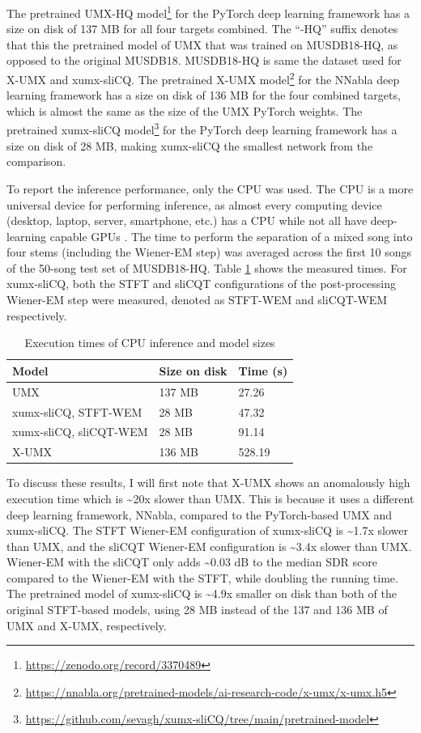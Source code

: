 \documentclass[report.tex]{subfiles}
\begin{document}
The pretrained UMX-HQ model\footnote{\url{https://zenodo.org/record/3370489}} for the PyTorch deep learning framework has a size on disk of 137 MB for all four targets combined. The ``-HQ'' suffix denotes that this the pretrained model of UMX that was trained on MUSDB18-HQ, as opposed to the original MUSDB18. MUSDB18-HQ is same the dataset used for X-UMX and xumx-sliCQ. The pretrained X-UMX model\footnote{\url{https://nnabla.org/pretrained-models/ai-research-code/x-umx/x-umx.h5}} for the NNabla deep learning framework has a size on disk of 136 MB for the four combined targets, which is almost the same as the size of the UMX PyTorch weights. The pretrained xumx-sliCQ model\footnote{\url{https://github.com/sevagh/xumx-sliCQ/tree/main/pretrained-model}} for the PyTorch deep learning framework has a size on disk of 28 MB, making xumx-sliCQ the smallest network from the comparison.

To report the inference performance, only the CPU was used. The CPU is a more universal device for performing inference, as almost every computing device (desktop, laptop, server, smartphone, etc.) has a CPU while not all have deep-learning capable GPUs \parencite{deepcpuinf, deepcpuinf2}. The time to perform the separation of a mixed song into four stems (including the Wiener-EM step) was averaged across the first 10 songs of the 50-song test set of MUSDB18-HQ. Table \ref{table:infperf} shows the measured times. For xumx-sliCQ, both the STFT and sliCQT configurations of the post-processing Wiener-EM step were measured, denoted as STFT-WEM and sliCQT-WEM respectively.

\begin{table}[ht]
	\centering
	\caption{Execution times of CPU inference and model sizes}
	\label{table:infperf}
	\begin{tabular}{ |l|l|l| }
	 \hline
		Model & Size on disk & Time (s) \\
	 \hline
	 \hline
		UMX & 137 MB & 27.26 \\
	 \hline
		xumx-sliCQ, STFT-WEM & 28 MB & 47.32 \\
	 \hline
		xumx-sliCQ, sliCQT-WEM & 28 MB & 91.14 \\
	 \hline
		X-UMX & 136 MB & 528.19 \\
	 \hline
\end{tabular}
\end{table}

To discuss these results, I will first note that X-UMX shows an anomalously high execution time which is \textasciitilde20x slower than UMX. This is because it uses a different deep learning framework, NNabla, compared to the PyTorch-based UMX and xumx-sliCQ. The STFT Wiener-EM configuration of xumx-sliCQ is \textasciitilde1.7x slower than UMX, and the sliCQT Wiener-EM configuration is \textasciitilde3.4x slower than UMX. Wiener-EM with the sliCQT only adds \textasciitilde0.03 dB to the median SDR score compared to the Wiener-EM with the STFT, while doubling the running time. The pretrained model of xumx-sliCQ is \textasciitilde4.9x smaller on disk than both of the original STFT-based models, using 28 MB instead of the 137 and 136 MB of UMX and X-UMX, respectively.
\end{document}
